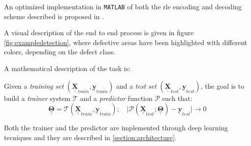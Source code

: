         \par{
            An optimized implementation in \texttt{MATLAB} of both the rle encoding and decoding scheme described is proposed in \cite{antonioterpin:github}.
        }
        \par{
            A visual description of the end to end process is given in figure \ref{fig:exampledetection}, where defective areas have been highlighted with different colors, depending on the defect class.
        }
        \par{
            A mathematical description of the task is:
        }
        \par{
            Given a \emph{training set} $\left(\underline{\underline{\mathbf{X}}}_{train}, \underline{\mathbf{y}}_{train}\right)$ and a \emph{test set} $\left(\underline{\underline{\mathbf{X}}}_{test}, \underline{\mathbf{y}}_{test}\right)$, the goal is to build a \emph{trainer} system $\mathcal{T}$ and a \emph{predictor} function $\mathcal{P}$ such that:
            \begin{equation*}
                \underline{\underline{\mathbf{\Theta}}} = \mathcal{T}\left(\underline{\underline{\mathbf{X}}}_{train}, \underline{\mathbf{y}}_{train}\right);\quad \lvert \mathcal{P}\left(\underline{\underline{\mathbf{X}}}_{test}; \underline{\underline{\mathbf{\Theta}}}\right) - \underline{\mathbf{y}}_{test} \rvert \rightarrow 0
            \end{equation*}
        }
        \par{
            Both the trainer and the predictor are implemented through deep learning tecniques and they are described in \ref{section:architecture}.
        }

